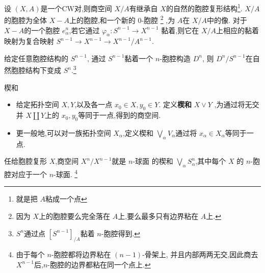 \documentclass[../../几何与拓扑.tex]{subfiles}
\begin{document}
\hspace*{\fill} 


\begin{proposition}
    设 \(  \left( X,A \right)   \)是一个CW对,则商空间 \(  X/A  \)有继承自 \(  X  \)的自然的胞腔复形结构\footnote{就是把 \(  A  \)粘成一个点 }. \(  X /A  \)的胞腔为全体 \(  X - A  \)上的胞腔,和一个新的 \(  0  \)-胞腔 \footnote{因为 \(  X  \)上的胞腔要么完全落在 \(  A  \)上,要么最多只有边界粘在 \(  A  \)上.    }    ,为 \(  A  \)在 \(  X /A  \)中的像. 对于 \(  X -A  \)的一个胞腔 \(  e_{\alpha }^{n}  \),若它通过 \(   \varphi _{\alpha }:S^{n-1}\to X^{n-1}  \)     黏着,则它在 \(  X / A  \)上相应的黏着映射为复合映射 \(  S^{n-1}\to X^{n-1}\to X^{n-1} / A^{n-1}  \).  
\end{proposition}

\begin{example}
    给定任意胞腔结构的 \(  S^{n-1}  \), 通过 \(  S^{n-1}  \)黏着一个 \(  n  \)-胞腔构造 \(  D^{n}  \), 则 \(  D^{n} / S^{n-1}  \)在自然胞腔结构下变成 \(  S^{n}  \).\footnote{\(  S^{n}  \)通过点 \(  [S^{n-1}]_{ / A}  \)黏着 \(  n  \)-胞腔得到.   }      
\end{example}

\hspace*{\fill} 


\begin{definition}{楔和}
    \begin{itemize}
        \item 给定拓扑空间 \(  X,Y  \),以及各一点 \(  x_0\in X,y_0\in Y  \). 定义\textbf{楔和} \(  X\vee Y  \)   ,为通过将无交并 \(  X \coprod  Y  \)上的 \(  x_0,y_0  \)等同于一点,得到的商空间.  
        \item 更一般地,可以对一族拓扑空间 \(  X_{\alpha }  \),定义楔和 \(  \bigvee _{\alpha }V_{\alpha } \)通过将 \(  x_{\alpha }\in X_{\alpha }  \)等同于一点.   
    \end{itemize}
    
\end{definition}

\begin{example}
    任给胞腔复形 \(  X  \),商空间 \(  X^{n} / X^{n-1}  \)就是 \(  n  \)-球面 的楔和 \(  \bigvee _{\alpha }S_{\alpha }^{n}  \),其中每个 \(  X  \) 的 \(  n  \)-胞腔对应于一个 \(  n  \)-球面.    \footnote{由于每个 \(  n  \)-胞腔都将边界粘在 \(  \left( n-1 \right)   \)-骨架上, 并且内部两两无交,因此商去 \(  X^{n-1}  \)后,\(  n  \)-胞腔的边界都粘在同一个点上.   }   
\end{example}

\hspace*{\fill} 
\end{document}
